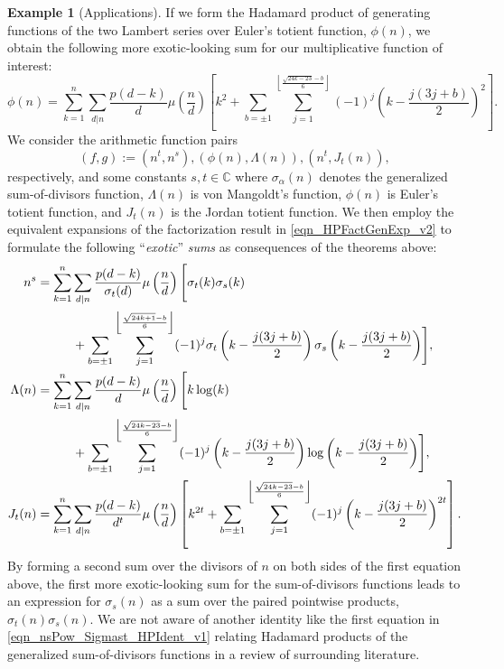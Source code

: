 \documentclass[12pt,reqno,a4letter]{article}
\numberwithin{figure}{section}
\numberwithin{table}{section}
\numberwithin{equation}{section}
\theoremstyle{plain}
\numberwithin{theorem}{section}
\theoremstyle{definition}
\newtheorem{example}[theorem]{Example}
\begin{document}
\begin{example}[Applications] 
\label{example_HPThm_consequences}
If we form the Hadamard product of generating functions of the two 
Lambert series over Euler's totient function, $\phi(n)$, we obtain the following more 
exotic-looking sum for our multiplicative function of interest: 
\[
\phi(n) = \sum_{k=1}^n \sum_{d|n} \frac{p(d-k)}{d} \mu\left(\frac{n}{d}\right) \left[k^2 + 
     \sum_{b=\pm 1} \sum_{j=1}^{\left\lfloor \frac{\sqrt{24k-23}-b}{6} \right\rfloor} (-1)^j 
     \left(k-\frac{j(3j+b)}{2}\right)^2\right]. 
\]
We consider the arithmetic function pairs 
$$(f, g) := (n^t, n^s), (\phi(n), \Lambda(n)), (n^t, J_t(n)), $$ 
respectively, and some constants $s,t \in \mathbb{C}$ where $\sigma_{\alpha}(n)$ denotes the 
generalized sum-of-divisors function, $\Lambda(n)$ is von Mangoldt's function, 
$\phi(n)$ is Euler's totient function, and $J_t(n)$ is the Jordan totient function. 
We then employ the equivalent expansions of the factorization result in \eqref{eqn_HPFactGenExp_v2} 
to formulate the following ``\emph{exotic}'' \emph{sums} as consequences of the theorems above: 
\begin{align}
\label{eqn_nsPow_Sigmast_HPIdent_v1} 
n^s & = \sum_{k=1}^n \sum_{d|n} \frac{p(d-k)}{\sigma_t(d)} \mu\left(\frac{n}{d}\right) 
     \Biggl[\sigma_t(k)\sigma_s(k) \\ 
\notag 
     & \phantom{=\sum\ } + 
     \sum_{b=\pm 1} \sum_{j=1}^{\left\lfloor \frac{\sqrt{24k+1}-b}{6} \right\rfloor} (-1)^j 
     \sigma_t\left(k-\frac{j(3j+b)}{2}   \right)\sigma_s\left(k-\frac{j(3j+b)}{2}\right)\Biggr], \\ 
\notag 
\Lambda(n) & = \sum_{k=1}^n \sum_{d|n} \frac{p(d-k)}{d} \mu\left(\frac{n}{d}\right) \Biggl[k\log(k) \\ 
\notag 
     & \phantom{=\sum\ } + 
     \sum_{b=\pm 1} \sum_{j=1}^{\left\lfloor \frac{\sqrt{24k-23}-b}{6} \right\rfloor} (-1)^j 
     \left(k-\frac{j(3j+b)}{2}\right)\log\left(k-\frac{j(3j+b)}{2}\right)\Biggr], \\ 
\notag 
J_t(n) & = \sum_{k=1}^n \sum_{d|n} \frac{p(d-k)}{d^t} \mu\left(\frac{n}{d}\right) \left[k^{2t} + 
     \sum_{b=\pm 1} \sum_{j=1}^{\left\lfloor \frac{\sqrt{24k-23}-b}{6} \right\rfloor} (-1)^j 
     \left(k-\frac{j(3j+b)}{2}\right)^{2t}\right].  
\end{align}
By forming a second sum over the divisors of $n$ on both sides of the first equation above, 
the first more exotic-looking sum for the sum-of-divisors functions leads to an expression for 
$\sigma_s(n)$ as a sum over the paired pointwise products, $\sigma_t(n) \sigma_s(n)$. 
We are not aware of another identity like the first equation in 
\eqref{eqn_nsPow_Sigmast_HPIdent_v1} 
relating Hadamard products of the generalized sum-of-divisors functions in 
a review of surrounding literature.
\end{example}
\end{document}
